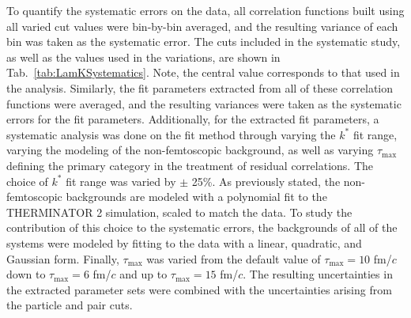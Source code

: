 \documentclass[ALICE,manyauthors]{cernphprep}
\newcommand{\kstar}{$k^{*}$\xspace}
\begin{document}
To quantify the systematic errors on the data, all correlation functions built using all varied cut values were bin-by-bin averaged, and the resulting variance of each bin was taken as the systematic error.  
The cuts included in the systematic study, as well as the values used in the variations, are shown in Tab.\ \ref{tab:LamKSystematics}.  
Note, the central value corresponds to that used in the analysis.
Similarly, the fit parameters extracted from all of these correlation functions were averaged, and the resulting variances were taken as the systematic errors for the fit parameters.
Additionally, for the extracted fit parameters, a systematic analysis was done on the fit method through varying the \kstar fit range, varying the modeling of the non-femtoscopic background, as well as varying $\tau_{\mathrm{max}}$ defining the primary category in the treatment of residual correlations.
The choice of \kstar fit range was varied by $\pm$ 25\%. 
As previously stated, the non-femtoscopic backgrounds are modeled with a polynomial fit to the THERMINATOR 2 simulation, scaled to match the data.
To study the contribution of this choice to the systematic errors, the backgrounds of all of the systems were modeled by fitting to the data with a linear, quadratic, and Gaussian form.
Finally, $\tau_{\mathrm{max}}$ was varied from the default value of $\tau_{\mathrm{max}} = 10$ fm/$c$ down to $\tau_{\mathrm{max}} = 6$ fm/$c$ and up to $\tau_{\mathrm{max}} = 15$ fm/$c$.
The resulting uncertainties in the extracted parameter sets were combined with the uncertainties arising from the particle and pair cuts.
\end{document}
